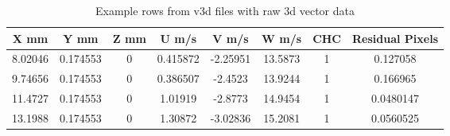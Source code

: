 \renewcommand\baselinestretch{1.3}\selectfont
\begin{table}[H]
\begin{center}
\begin{tabular}{|cccccccc|}
	\hline
	X mm & Y mm  & Z mm & U m/s & V m/s & W m/s & CHC & Residual Pixels\\
	\hline
	8.02046 & 0.174553 & 0 & 0.415872 & -2.25951 & 13.5873 & 1 & 0.127058\\
	9.74656 & 0.174553 & 0 & 0.386507 & -2.4523 & 13.9244 & 1 & 0.166965\\
	11.4727 & 0.174553 & 0 & 1.01919 & -2.8773 & 14.9454 & 1 & 0.0480147\\
	13.1988 & 0.174553 & 0 & 1.30872 & -3.02836 & 15.2081 & 1 & 0.0560525\\
	\hline
\end{tabular}
\caption{Example rows from v3d files with raw 3d vector data}
\label{table:v3d_row_example}
\end{center}
\end{table}
\renewcommand\baselinestretch{2}\selectfont
